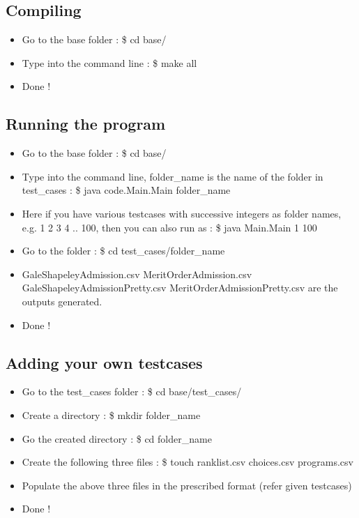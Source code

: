 \documentclass[]{report}
\begin{document}
\subsection{Compiling}
\begin{itemize}
\item Go to the base folder : \$ cd base/
\item Type into the command line : \$ make all
\item Done ! 
\end{itemize}

\subsection{Running the program}
\begin{itemize}
\item Go to the base folder : \$ cd base/
\item Type into the command line, folder\_name is the name of the folder in test\_cases : \$ java code.Main.Main folder\_name
\item Here if you have various testcases with successive integers as folder names, e.g. 1 2 3 4 .. 100, then you can also run as :  \$ java Main.Main 1 100
\item Go to the folder : \$ cd test\_cases/folder\_name
\item GaleShapeleyAdmission.csv MeritOrderAdmission.csv GaleShapeleyAdmissionPretty.csv MeritOrderAdmissionPretty.csv are the outputs generated.
\item Done !
\end{itemize}

\subsection{Adding your own testcases}
\begin{itemize}
\item Go to the test\_cases folder : \$ cd base/test\_cases/
\item Create a directory : \$ mkdir folder\_name
\item Go the created directory : \$ cd folder\_name
\item Create the following three files : \$ touch ranklist.csv choices.csv programs.csv
\item Populate the above three files in the prescribed format (refer given testcases)
\item Done ! 
\end{itemize}
\end{document}
